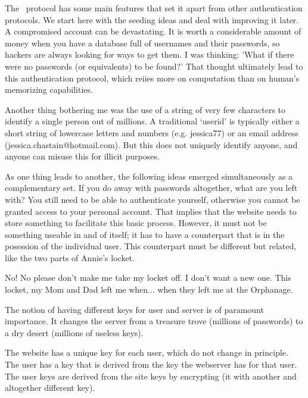 The \TIMO\ protocol has some main features that set it apart from other authentication protocols.
We start here with the seeding ideas and deal with improving it later.
A compromised account can be devastating.
It is worth a considerable amount of money when you have a database full of usernames and their passwords, so hackers are always looking for ways to get them.
I was thinking: 'What if there were no passwords (or equivalents) to be found?'
That thought ultimately lead to this authentication protocol, which reiies more on computation than on human's memorizing capabilities.
\par
Another thing bothering me was the use of a string of very few characters to identify a single person out of millions.
A traditional `userid' is typically either a short string of lowercase letters and numbers
(e.g. jessica77)
or an email address
(jessica.chastain@hotmail.com).
But this does not uniquely identify anyone, and anyone can misuse this for illicit purposes.
\par
As one thing leads to another, the following ideas emerged simultaneously as a complementary set.
If you do away with passwords altogether, what are you left with?
You still need to be able to authenticate yourself, otherwise you cannot be granted access to your personal account.
That implies that the website needs to store something to facilitate this basic process.
However, it must not be something useable in and of itself; it has to have a counterpart that is in the posession of the individual user.
This counterpart must be different but related, like the two parts of Annie's locket.
\begin{dialogue}
No! No please don't make me take my locket off. I don't want a new one.
This locket, my Mom and Dad left me when... when they left me at the Orphanage.
\end{dialogue}
\par
The notion of having different keys for user and server is of paramount importance.
It changes the server from a treasure trove (millions of passwords) to a dry desert (millions of useless keys).
\par
The website has a unique key for each user, which do not change in principle.
The user has a key that is derived from the key the webserver has for that user.
The user keys are derived from the site keys by encrypting (it with another and altogether different key).
